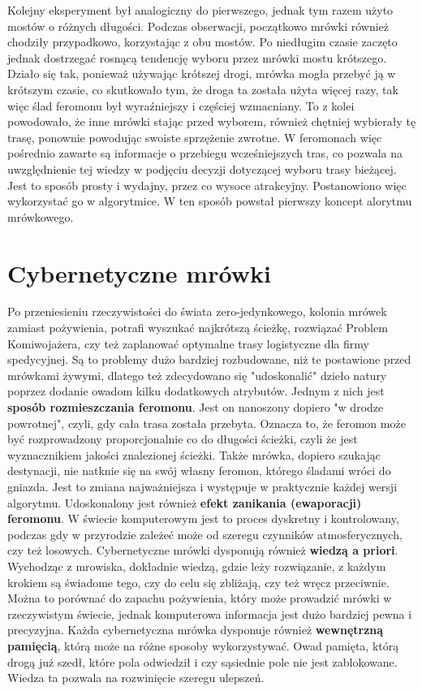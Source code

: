 \documentclass[printmode, openany, oneside, eng]{mgr}
\begin{document}
Kolejny eksperyment był analogiczny do pierwszego, jednak tym razem użyto mostów o różnych długości. Podczas obserwacji, początkowo mrówki również chodziły przypadkowo, korzystając z obu mostów. Po niedługim czasie zaczęto jednak dostrzegać rosnącą tendencję wyboru przez mrówki mostu krótszego. Działo się tak, ponieważ używając krótszej drogi, mrówka mogła przebyć ją w krótszym czasie, co skutkowało tym, że droga ta została użyta więcej razy, tak więc ślad feromonu był wyraźniejszy i częściej wzmacniany. To z kolei powodowało, że inne mrówki stając przed wyborem, również chętniej wybierały tę trasę, ponownie powodując swoiste sprzężenie zwrotne.
W feromonach więc pośrednio zawarte są informacje o przebiegu wcześniejszych tras, co pozwala na uwzględnienie tej wiedzy w
podjęciu decyzji dotyczącej wyboru trasy bieżącej. Jest to sposób prosty i wydajny, przez co wysoce atrakcyjny. Postanowiono więc wykorzystać go w algorytmice. W ten sposób powstał pierwszy koncept alorytmu mrówkowego.


\section{Cybernetyczne mrówki}\label{sec:wstepMrowki}
Po przeniesieniu rzeczywistości do świata zero-jedynkowego, kolonia mrówek zamiast pożywienia, potrafi wyszukać najkrótszą
ścieżkę, rozwiązać Problem Komiwojażera, czy też zaplanować optymalne trasy logistyczne dla firmy spedycyjnej. Są to problemy dużo bardziej rozbudowane, niż te postawione przed mrówkami żywymi, dlatego też zdecydowano się "udoskonalić" dzieło natury poprzez dodanie owadom kilku dodatkowych atrybutów. Jednym z nich jest \textbf{sposób rozmieszczania feromonu}. Jest on nanoszony dopiero "w drodze powrotnej", czyli, gdy cała trasa została przebyta. Oznacza to, że feromon może być rozprowadzony proporcjonalnie co do długości ścieżki, czyli że jest wyznacznikiem jakości znalezionej ścieżki. Także mrówka, dopiero szukając destynacji, nie natknie się na swój własny feromon, którego śladami wróci do gniazda. Jest to zmiana najważniejsza i występuje w praktycznie każdej wersji algorytmu. 
\newline 
Udoskonalony jest również \textbf{efekt zanikania (ewaporacji) feromonu}. W świecie komputerowym jest to proces dyskretny i kontrolowany, podczas gdy w przyrodzie zależeć może od szeregu czynników atmosferycznych, czy też losowych. 
\newline 
Cybernetyczne mrówki dysponują również \textbf{wiedzą a priori}. Wychodząc z mrowiska, dokładnie wiedzą, gdzie leży rozwiązanie, z każdym krokiem są świadome tego, czy do celu się zbliżają, czy też wręcz przeciwnie. Można to porównać do zapachu pożywienia, który może prowadzić mrówki w rzeczywistym świecie, jednak komputerowa informacja jest dużo bardziej pewna i precyzyjna. 
\newline
Każda cybernetyczna mrówka dysponuje również \textbf{wewnętrzną pamięcią}, którą może na różne sposoby wykorzystywać. Owad pamięta, którą drogą już szedł, które pola odwiedził i czy sąsiednie pole nie jest zablokowane. Wiedza ta pozwala na rozwinięcie szeregu ulepszeń.
\end{document}
